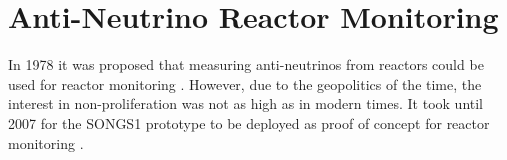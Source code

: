 \section{Anti-Neutrino Reactor Monitoring}
In 1978 it was proposed that measuring anti-neutrinos from reactors could be used for reactor monitoring \cite{Borovoi_1978}. However, due to the geopolitics of the time, the interest in non-proliferation was not as high as in modern times. It took until 2007 for the SONGS1 prototype to be deployed as proof of concept for reactor monitoring \cite{Bowden_2007}.
